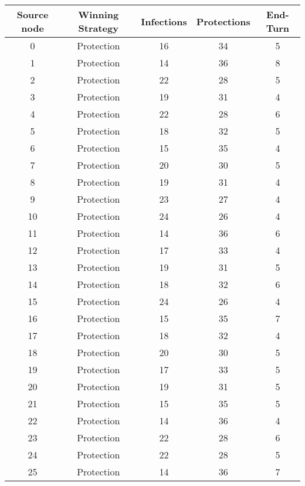 \documentclass[results.tex]{subfiles}
\begin{document}
\begin{center}
  \begin{tabular}{| c || c | c | c | c |}
    \hline
    {\bfseries Source node} & {\bfseries Winning Strategy} & {\bfseries Infections} & {\bfseries Protections} & {\bfseries End-Turn} \\  %
    \hline\hline
    0 & Protection & 16 & 34 & 5 \\ 
    \hline
    1 & Protection & 14 & 36 & 8 \\ 
    \hline
    2 & Protection & 22 & 28 & 5 \\ 
    \hline
    3 & Protection & 19 & 31 & 4 \\ 
    \hline
    4 & Protection & 22 & 28 & 6 \\ 
    \hline
    5 & Protection & 18 & 32 & 5 \\ 
    \hline
    6 & Protection & 15 & 35 & 4 \\ 
    \hline
    7 & Protection & 20 & 30 & 5 \\ 
    \hline
    8 & Protection & 19 & 31 & 4 \\ 
    \hline
    9 & Protection & 23 & 27 & 4 \\ 
    \hline
    10 & Protection & 24 & 26 & 4 \\ 
    \hline
    11 & Protection & 14 & 36 & 6 \\ 
    \hline
    12 & Protection & 17 & 33 & 4 \\ 
    \hline
    13 & Protection & 19 & 31 & 5 \\ 
    \hline
    14 & Protection & 18 & 32 & 6 \\ 
    \hline
    15 & Protection & 24 & 26 & 4 \\ 
    \hline
    16 & Protection & 15 & 35 & 7 \\ 
    \hline
    17 & Protection & 18 & 32 & 4 \\ 
    \hline
    18 & Protection & 20 & 30 & 5 \\ 
    \hline
    19 & Protection & 17 & 33 & 5 \\ 
    \hline
    20 & Protection & 19 & 31 & 5 \\ 
    \hline
    21 & Protection & 15 & 35 & 5 \\ 
    \hline
    22 & Protection & 14 & 36 & 4 \\ 
    \hline
    23 & Protection & 22 & 28 & 6 \\ 
    \hline
    24 & Protection & 22 & 28 & 5 \\ 
    \hline
    25 & Protection & 14 & 36 & 7 \\ 

\end{tabular}
\end{center}
\end{document}
